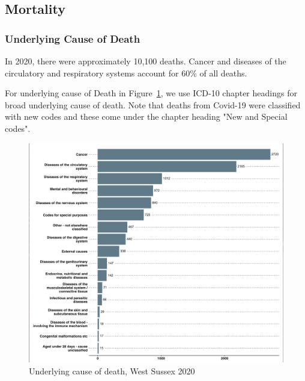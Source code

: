 


\subsection{Mortality}
\subsubsection{Underlying Cause of Death} In 2020, there were approximately 10,100 deaths. Cancer and diseases of the circulatory and respiratory systems account for 60\% of all deaths.

For underlying cause of Death in Figure~\ref{fig:underlying-cod}, we use ICD-10 chapter headings for broad underlying cause of death. Note that deaths from Covid-19 were classified with new codes and these come under the chapter heading "New and Special codes".

\begin{figure}
    \caption{Underlying cause of death, West Sussex 2020}\label{fig:underlying-cod}
    \centering
    \includegraphics[width=\linewidth]{images/underlying_cause_of_death.png}
\end{figure}

